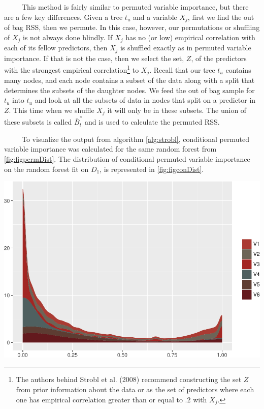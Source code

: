 \documentclass[12pt,twoside]{reedthesis}
\let\origfigure\figure
\let\endorigfigure\endfigure
\renewenvironment{figure}[1][2] {
    \expandafter\origfigure\expandafter[H]
} {
    \endorigfigure
}
\begin{document}
  ~~~~~This method is fairly similar to permuted variable importance, but
  there are a few key differences. Given a tree \(t_u\) and a variable
  \(X_j\), first we find the out of bag RSS, then we permute. In this
  case, however, our permutations or shuffling of \(X_j\) is not always
  done blindly. If \(X_j\) has no (or low) empirical correlation with each
  of its fellow predictors, then \(X_j\) is shuffled exactly as in
  permuted variable importance. If that is not the case, then we select
  the set, \(Z\), of the predictors with the strongest empirical
  correlation\footnote{The authors behind Strobl et al. (2008) recommend
    constructing the set \(Z\) from prior information about the data or as
    the set of predictors where each one has empirical correlation greater
    than or equal to .2 with \(X_j\).} to \(X_j\). Recall that our tree
  \(t_u\) contains many nodes, and each node contains a subset of the data
  along with a split that determines the subsets of the daughter nodes. We
  feed the out of bag sample for \(t_u\) into \(t_u\) and look at all the
  subsets of data in nodes that split on a predictor in \(Z\). This time
  when we shuffle \(X_j\) it will only be in these subsets. The union of
  these subsets is called \(\bar{B}_t^*\) and is used to calculate the
  permuted RSS.
  
  ~~~~~To visualize the output from algorithm \ref{alg:strobl},
  conditional permuted variable importance was calculated for the same
  random forest from \ref{fig:figpermDist}. The distribution of
  conditional permuted variable importance on the random forest fit on
  \(D_1\), is represented in \ref{fig:figconDist}.
  
  \begin{figure}[htbp]
  \centering
  \includegraphics{Thesis_files/figure-latex/unnamed-chunk-26-1.pdf}
  \caption{\label{fig:unnamed-chunk-26}\label{fig:figconDist}The distribution
  of conditional permuted variable importance for the first six variables
  in D1.}
  \end{figure}
  
\end{document}
